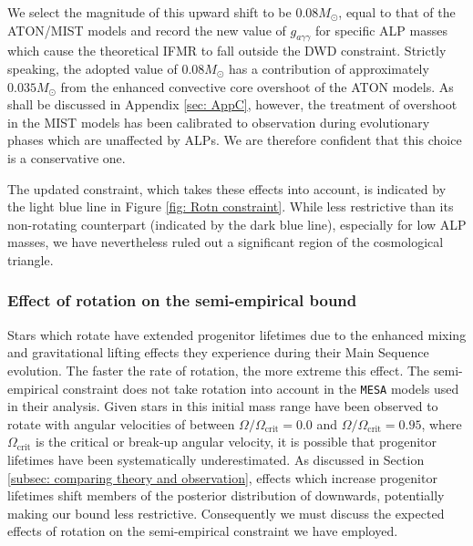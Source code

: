 We select the magnitude of this upward shift to be $0.08M_{\odot}$, equal to that of the ATON/MIST models and record the new value of $g_{a\gamma\gamma}$ for specific ALP masses which cause the theoretical IFMR to fall outside the DWD constraint. Strictly speaking, the adopted value of $0.08M_{\odot}$ has a contribution of approximately $0.035M_{\odot}$ from the enhanced convective core overshoot of the ATON models. As shall be discussed in Appendix \ref{sec: AppC}, however, the treatment of overshoot in the MIST models has been calibrated to observation during evolutionary phases which are unaffected by ALPs. We are therefore confident that this choice is a conservative one.


The updated constraint, which takes these effects into account, is indicated by the light blue line in Figure \ref{fig: Rotn constraint}. While less restrictive than its non-rotating counterpart (indicated by the dark blue line), especially for low ALP masses, we have nevertheless ruled out a significant region of the cosmological triangle. 


\subsubsection*{Effect of rotation on the semi-empirical bound}
Stars which rotate have extended progenitor lifetimes due to the enhanced mixing and gravitational lifting effects they experience during their Main Sequence evolution. The faster the rate of rotation, the more extreme this effect. The semi-empirical constraint \cite{Andrews} does not take rotation into account in the \texttt{MESA} models used in their analysis. Given stars in this initial mass range have been observed to rotate with angular velocities of between $\Omega/\Omega_{\mathrm{crit}}=0.0$ and $\Omega/\Omega_{\mathrm{crit}}=0.95$, where $\Omega_{\mathrm{crit}}$ is the critical or break-up angular velocity, it is possible that progenitor lifetimes have been systematically underestimated. As discussed in Section \ref{subsec: comparing theory and observation}, effects which increase progenitor lifetimes shift members of the posterior distribution of \cite{Andrews} downwards, potentially making our bound less restrictive. Consequently we must discuss the expected effects of rotation on the semi-empirical constraint we have employed.



